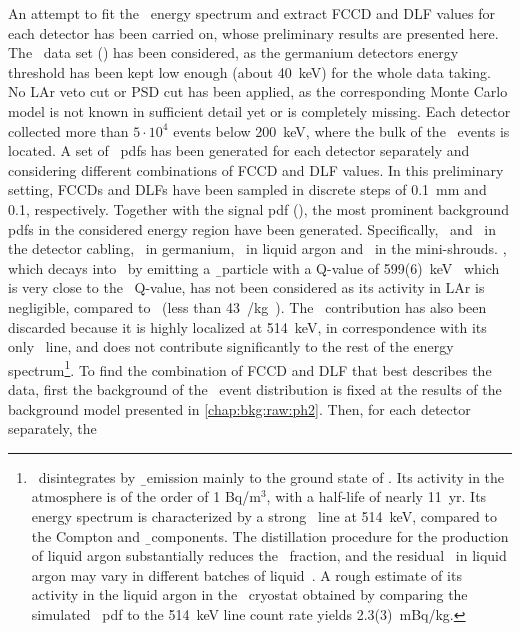 An attempt to fit the \Arl\ energy spectrum and extract FCCD and DLF values for each
detector has been carried on, whose preliminary results are presented here. The
\phasetwop\ data set (\gexpophasetwopbkg) has been considered, as the germanium detectors
energy threshold has been kept low enough (about 40~keV) for the whole data taking. No LAr
veto cut or PSD cut has been applied, as the corresponding Monte Carlo model is not known
in sufficient detail yet or is completely missing. Each detector collected more than $5
\cdot 10^4$ events below 200~keV, where the bulk of the \Arl\ events is located.
\newpar
A set of \Arl\ pdfs has been generated for each detector separately and considering
different combinations of FCCD and DLF values. In this preliminary setting, FCCDs and DLFs
have been sampled in discrete steps of 0.1~mm and 0.1, respectively. Together with the
signal pdf (\Arl), the most prominent background pdfs in the considered energy region have
been generated.  Specifically, \Pbh\ and \Bih\ in the detector cabling, \nnbb\ in
germanium, \kvz\ in liquid argon and \kvn\ in the mini-shrouds. \Arh, which decays into
\kvz\ by emitting a \b\ particle with a Q-value of 599(6)~keV~\cite{Wang2017} which is
very close to the \Arl\ Q-value, has not been considered as its activity in LAr is
negligible, compared to \Arl\ (less than 43~\mubq/kg~\cite{Ashitkov2003}). The \Kr\
contribution has also been discarded because it is highly localized at 514~keV, in
correspondence with its only \g\ line, and does not contribute significantly to the rest
of the energy spectrum\footnote{%
  \Kr\ disintegrates by \b\ emission mainly to the ground state of . Its
  activity in the atmosphere is of the order of 1 Bq/m$^3$, with a half-life of nearly
  11~yr. Its energy spectrum is characterized by a strong \g\ line at 514~keV, compared to
  the Compton and \b\ components. The distillation procedure for the production of liquid
  argon substantially reduces the \Kr\ fraction, and the residual \Kr\ in liquid argon may
  vary in different batches of liquid~\cite{Benetti2006}. A rough estimate of its
  activity in the liquid argon in the \gerda\ cryostat obtained by comparing the simulated
  \Kr\ pdf to the 514~keV line count rate yields 2.3(3)~mBq/kg.
}. To find the
combination of FCCD and DLF that best describes the data, first the background of
the \Arl\ event distribution is fixed at the results of the background model
presented in \cref{chap:bkg:raw:ph2}. Then, for each detector separately, the \Arl\
